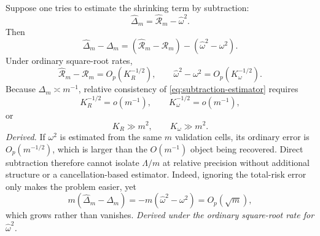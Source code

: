 \documentclass[11pt]{article}
\begin{document}
Suppose one tries to estimate the shrinking term by subtraction:
\begin{equation}
 \widehat\Delta_m
 =\widehat{\mathcal R}_m-\widehat\omega^2.
 \label{eq:subtraction-estimator}
\end{equation}
Then
\begin{equation}
 \widehat\Delta_m-\Delta_m
 =(\widehat{\mathcal R}_m-\mathcal R_m)
 -(\widehat\omega^2-\omega^2).
 \label{eq:subtraction-error}
\end{equation}
Under ordinary square-root rates,
\begin{equation}
 \widehat{\mathcal R}_m-\mathcal R_m=O_p(K_R^{-1/2}),
 \qquad
 \widehat\omega^2-\omega^2=O_p(K_\omega^{-1/2}).
 \label{eq:risk-estimation-rates}
\end{equation}
Because \(\Delta_m\asymp m^{-1}\), relative consistency of
\eqref{eq:subtraction-estimator} requires
\begin{equation}
 K_R^{-1/2}=o(m^{-1}),
 \qquad
 K_\omega^{-1/2}=o(m^{-1}),
\end{equation}
or
\begin{equation}
 K_R\gg m^2,
 \qquad
 K_\omega\gg m^2.
 \label{eq:m-squared-requirement}
\end{equation}
\emph{Derived.} If \(\omega^2\) is estimated from the same \(m\) validation
cells, its ordinary error is \(O_p(m^{-1/2})\), which is larger than the
\(O(m^{-1})\) object being recovered. Direct subtraction therefore cannot
isolate \(\Lambda/m\) at relative precision without additional structure or
a cancellation-based estimator.
Indeed, ignoring the total-risk error only makes the problem easier, yet
\begin{equation}
 m(\widehat\Delta_m-\Delta_m)
 =-m(\widehat\omega^2-\omega^2)
 =O_p(\sqrt m),
 \label{eq:scaled-subtraction-error}
\end{equation}
which grows rather than vanishes. \emph{Derived under the ordinary
square-root rate for \(\widehat\omega^2\).}
\end{document}
